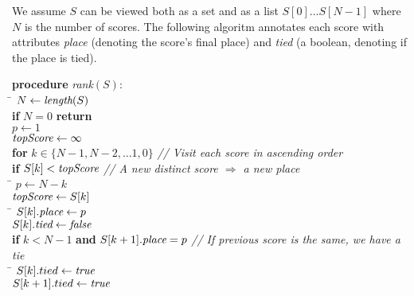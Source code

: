 \documentclass[11pt,a4paper]{article}
\begin{document}
\noindent
We assume $S$ can be viewed both as a set and as a list
$S[0] \ldots S[N-1]$ where $N$ is the number of scores.
The following algoritm annotates each score with
attributes \emph{place} (denoting the score's final place)
and \emph{tied} (a boolean, denoting if the place is tied).

\begin{tabbing}
\qquad  \textbf{procedure} \emph{rank}$(S)$: \\
\qquad  \qquad \= $N \leftarrow \emph{length}(S)$ \\
\qquad         \> \textbf{if} $N = 0$ \textbf{return} \\
\qquad         \> $p \leftarrow 1$ \\
\qquad         \> $\emph{topScore} \leftarrow \infty$ \\
\qquad         \> \textbf{for} $k \in \{ N-1, N-2, \ldots 1, 0 \}$ \= \emph{// Visit each score in ascending order} \\
\qquad  \qquad\qquad \= \textbf{if} $S[k] < \emph{topScore}$ \> \emph{// A new distinct score $\Rightarrow$ a new place} \\ 
\qquad  \qquad\qquad\qquad \= $p \leftarrow N - k$ \\
\qquad                     \> $\emph{topScore} \leftarrow S[k]$ \\
\qquad  \qquad\qquad \= $S[k].\emph{place} \leftarrow p$ \\
\qquad               \> $S[k].\emph{tied} \leftarrow \emph{false}$ \\
\qquad               \> \textbf{if} $k < N-1$ \textbf{and} $S[k+1].\emph{place} = p$ \emph{// If previous score is the same, we have a tie}\\
\qquad  \qquad\qquad\qquad \= $S[k].tied \leftarrow \emph{true}$ \\
\qquad                     \> $S[k+1].tied \leftarrow \emph{true}$ 
\end{tabbing}
\end{document}

